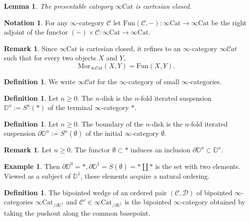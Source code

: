 \documentclass[10pt,oneside]{article}
\numberwithin{equation}{section} %
\numberwithin{figure}{section} %
\theoremstyle{plain}
\newtheorem{lemma}[theorem]{Lemma}
\theoremstyle{definition}
\newtheorem{definition}[theorem]{Definition}
\newtheorem{notation}[theorem]{Notation}
\newtheorem{remark}[theorem]{Remark}
\newtheorem{example}[theorem]{Example}
\newcommand{\bD}{{\mathbb D}}
\newcommand{\mC}{{\mathcal C}}
\newcommand{\mD}{{\mathcal D}}
\newcommand{\n}{{n}}
\newcommand{\Cat}{\mathrm{Cat}}
\newcommand{\Fun}{\mathrm{Fun}}
\newcommand{\Mor}{{\mathrm{Mor}}}
\newcommand{\scat}{\mathcal{C}\mathit{at}}
\begin{document}
\begin{lemma}\label{carclo}
The presentable category $\infty\Cat$ is cartesian closed.
\end{lemma}

\begin{notation}

For any $\infty$-category $\mC$ let 
$\Fun(\mC,-): \infty\Cat \to \infty\Cat$ be the right adjoint of the functor $(-) \times \mC:\infty\Cat \to \infty\Cat.$
    
\end{notation}

\begin{remark}
Since $\infty\Cat$ is cartesian closed, it refines to an $\infty$-category $\infty\scat$ such that for every two objects $X$ and $Y$,
\[
\Mor_{\infty\scat}(X,Y)=\Fun(X,Y).
\]
\end{remark}

\begin{definition}
    We write $\infty\scat$ for the $\infty$-category of small $\infty$-categories.
\end{definition}

\begin{definition}Let $\n \geq 0$.
The $\n$-disk is the $n$-fold iterated suspension $\bD^\n:= S^{\n}(*)$ of the terminal $\infty$-category $\ast$.
\end{definition}


\begin{definition}Let $\n \geq 0$.
The boundary of the $\n$-disk is the $n$-fold iterated suspension $\partial\bD^\n:= S^{\n}(\emptyset)$ of the initial $\infty$-category $\emptyset$.
	
\end{definition}

\begin{remark}Let $\n \geq 0.$
The functor $\emptyset \subset *$ induces an inclusion $\partial\bD^\n \subset \bD^\n$.
	
\end{remark}

\begin{example}
Then $\partial\bD^0=\ast, \partial\bD^1=S(\emptyset)=*\coprod*$ is the set with two elements.
Viewed as a subject of $\bD^1$, these elements acquire a natural ordering.
\end{example}


\begin{definition}
The bipointed wedge of an ordered pair $(\mC,\mD)$ of bipointed $\infty$-categories  $\infty\Cat_{/\partial\bD^1}$ and $\mC'\in\infty\Cat_{/\partial\bD^1}$ is the bipointed $\infty$-category obtained by taking the pushout along the common basepoint.
\end{definition}
\end{document}
